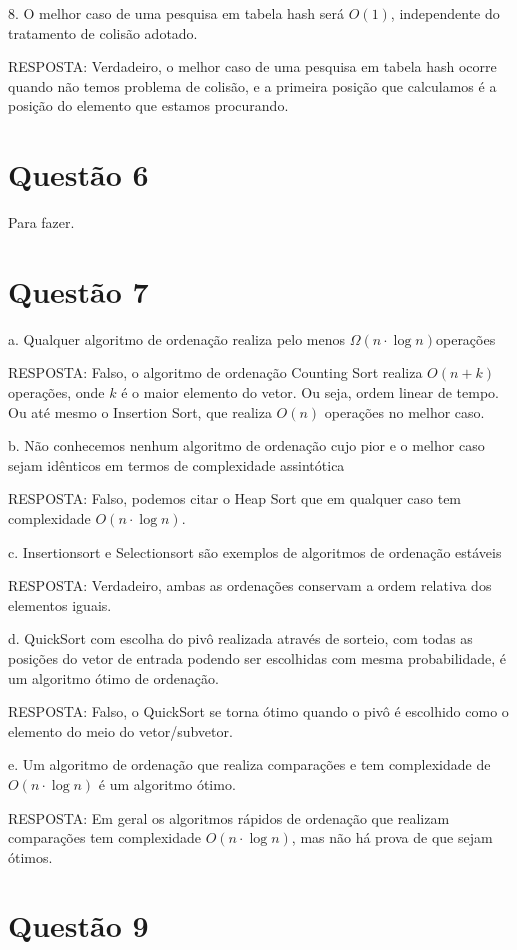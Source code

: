 \documentclass{article}
\begin{document}
8. O melhor caso de uma pesquisa em tabela hash será $O(1)$, independente do tratamento de colisão
adotado.

RESPOSTA: Verdadeiro, o melhor caso de uma pesquisa em tabela hash ocorre quando não temos problema de colisão, e a primeira posição que calculamos é a posição do elemento que estamos procurando.

\section{Questão 6}

Para fazer.


\section{Questão 7}

a. Qualquer algoritmo de ordenação realiza pelo menos $\Omega (n \cdot \log n)$operações

RESPOSTA: Falso, o algoritmo de ordenação Counting Sort realiza $O(n+k)$ operações, onde $k$ é o maior elemento do vetor. Ou seja, ordem linear de tempo. 
Ou até mesmo o Insertion Sort, que realiza $O(n)$ operações no melhor caso.

b. Não conhecemos nenhum algoritmo de ordenação cujo pior e o melhor caso sejam idênticos em termos
de complexidade assintótica

RESPOSTA: Falso, podemos citar o Heap Sort que em qualquer caso tem complexidade $O(n \cdot \log n)$.

c. Insertionsort e Selectionsort são exemplos de algoritmos de ordenação estáveis

RESPOSTA: Verdadeiro, ambas as ordenações conservam a ordem relativa dos elementos iguais.

d. QuickSort com escolha do pivô realizada através de sorteio, com todas as posições do vetor de entrada
podendo ser escolhidas com mesma probabilidade, é um algoritmo ótimo de ordenação.

RESPOSTA: Falso, o QuickSort se torna ótimo quando o pivô é escolhido como o elemento do meio do vetor/subvetor.

e. Um algoritmo de ordenação que realiza comparações e tem complexidade de $O(n \cdot \log n)$ é um algoritmo ótimo.

RESPOSTA: Em geral os algoritmos rápidos de ordenação que realizam comparações tem complexidade $O(n \cdot \log n)$, mas não há prova de que sejam ótimos. 


\section{Questão 9}
\end{document}
